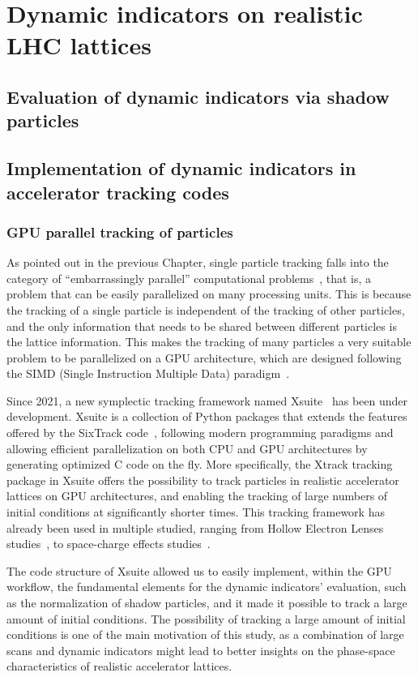 \chapter{Dynamic indicators on realistic LHC lattices}

\section{Evaluation of dynamic indicators via shadow particles}

\section{Implementation of dynamic indicators in accelerator tracking codes} \label{sec:implement}
%

\subsection{GPU parallel tracking of particles}

As pointed out in the previous Chapter, single particle tracking falls into the category of ``embarrassingly parallel'' computational problems~\cite{}, that is, a problem that can be easily parallelized on many processing units. This is because the tracking of a single particle is independent of the tracking of other particles, and the only information that needs to be shared between different particles is the lattice information. This makes the tracking of many particles a very suitable problem to be parallelized on a GPU architecture, which are designed following the SIMD (Single Instruction Multiple Data) paradigm~\cite{}.

Since 2021, a new symplectic tracking framework named Xsuite~\cite{xsuite} has been under development. Xsuite is a collection of Python packages that extends the features offered by the SixTrack code~\cite{De_Maria_2019}, following modern programming paradigms and allowing efficient parallelization on both CPU and GPU architectures by generating optimized C code on the fly. More specifically, the Xtrack tracking package in Xsuite offers the possibility to track particles in realistic accelerator lattices on GPU architectures, and enabling the tracking of large numbers of initial conditions at significantly shorter times. This tracking framework has already been used in multiple studied, ranging from Hollow Electron Lenses studies~\cite{}, to space-charge effects studies~\cite{}.

The code structure of Xsuite allowed us to easily implement, within the GPU workflow, the fundamental elements for the dynamic indicators' evaluation, such as the normalization of shadow particles, and it made it possible to track a large amount of initial conditions. The possibility of tracking a large amount of initial conditions is one of the main motivation of this study, as a combination of large scans and dynamic indicators might lead to better insights on the phase-space characteristics of realistic accelerator lattices.
%
